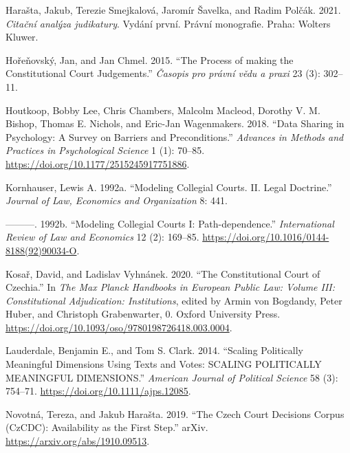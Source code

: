 \documentclass[
  11pt,
]{article}
\newlength{\cslhangindent}
\newenvironment{CSLReferences}[2] %
 {%
  \setlength{\parindent}{0pt}
  \ifodd #1 \everypar{\setlength{\hangindent}{\cslhangindent}}\ignorespaces\fi
  \ifnum #2 > 0
  \setlength{\parskip}{#2\baselineskip}
  \fi
 }%
 {}
\begin{document}
\begin{CSLReferences}{1}{0}
\leavevmode{}%
Harašta, Jakub, Terezie Smejkalová, Jaromír Šavelka, and Radim Polčák.
2021. \emph{{Cita{č}n{í} anal{ý}za judikatury}}. Vyd{á}n{í} prvn{í}.
{Pr{á}vn{í} monografie}. {Praha}: {Wolters Kluwer}.

\leavevmode{}%
Hořeňovský, Jan, and Jan Chmel. 2015. {``{The Process of making the
Constitutional Court Judgements}.''} \emph{{Č}asopis pro pr{á}vn{í}
v{ě}du a praxi} 23 (3): 302--11.

\leavevmode{}%
Houtkoop, Bobby Lee, Chris Chambers, Malcolm Macleod, Dorothy V. M.
Bishop, Thomas E. Nichols, and Eric-Jan Wagenmakers. 2018. {``Data
{Sharing} in {Psychology}: {A Survey} on {Barriers} and
{Preconditions}.''} \emph{Advances in Methods and Practices in
Psychological Science} 1 (1): 70--85.
\url{https://doi.org/10.1177/2515245917751886}.

\leavevmode{}%
Kornhauser, Lewis A. 1992a. {``Modeling {Collegial Courts}. {II}. {Legal
Doctrine}.''} \emph{Journal of Law, Economics and Organization} 8: 441.

\leavevmode{}%
---------. 1992b. {``Modeling Collegial Courts {I}:
{Path-dependence}.''} \emph{International Review of Law and Economics}
12 (2): 169--85. \url{https://doi.org/10.1016/0144-8188(92)90034-O}.

\leavevmode{}%
Kosař, David, and Ladislav Vyhnánek. 2020. {``The {Constitutional Court}
of {Czechia}.''} In \emph{The {Max Planck Handbooks} in {European Public
Law}: {Volume III}: {Constitutional Adjudication}: {Institutions}},
edited by Armin von Bogdandy, Peter Huber, and Christoph Grabenwarter,
0. {Oxford University Press}.
\url{https://doi.org/10.1093/oso/9780198726418.003.0004}.

\leavevmode{}%
Lauderdale, Benjamin E., and Tom S. Clark. 2014. {``Scaling {Politically
Meaningful Dimensions Using Texts} and {Votes}: {SCALING POLITICALLY
MEANINGFUL DIMENSIONS}.''} \emph{American Journal of Political Science}
58 (3): 754--71. \url{https://doi.org/10.1111/ajps.12085}.

\leavevmode{}%
Novotná, Tereza, and Jakub Harašta. 2019. {``The {Czech Court Decisions
Corpus} ({CzCDC}): {Availability} as the {First Step}.''} {arXiv}.
\url{https://arxiv.org/abs/1910.09513}.


\end{CSLReferences}
\end{document}
